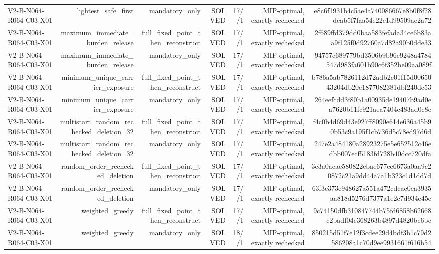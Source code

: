 {\begin{longtable}{lrrrrrr}
V2-B-N064-R064-C03-X01 & lightest\_safe\_first & mandatory\_only & SOLVED & 17//1 & MIP-optimal, exactly rechecked & e8c6f1931b4c5ae4a740086667e8b0f8f28dcab5f7faa54e22e1d99509ae2a72 \\
V2-B-N064-R064-C03-X01 & maximum\_immediate\_burden\_release & full\_fixed\_point\_then\_reconstruct & SOLVED & 17//1 & MIP-optimal, exactly rechecked & 2f689ffd379dd0baa583fefada34ce6b83aa9f125f0d92760a7d82a90b0dde33 \\
V2-B-N064-R064-C03-X01 & maximum\_immediate\_burden\_release & mandatory\_only & SOLVED & 17//1 & MIP-optimal, exactly rechecked & 94757c689779bd3506b9b96e9248a4784547d983fa601b90c6f352be09aa089f \\
V2-B-N064-R064-C03-X01 & minimum\_unique\_carrier\_exposure & full\_fixed\_point\_then\_reconstruct & SOLVED & 17//1 & MIP-optimal, exactly rechecked & b786a5ab7826112d72adb2e01f15d0065043204db20e1877082381dbf240dc53 \\
V2-B-N064-R064-C03-X01 & minimum\_unique\_carrier\_exposure & mandatory\_only & SOLVED & 17//1 & MIP-optimal, exactly rechecked & 264eefcdd3f80b1a00935de19407b9ad0ea7620b11fc921aea7404c483ad0e8e \\
V2-B-N064-R064-C03-X01 & multistart\_random\_rechecked\_deletion\_32 & full\_fixed\_point\_then\_reconstruct & SOLVED & 17//1 & MIP-optimal, exactly rechecked & f4c0b4d69d43e927ff8090e614e636a45b90b53c9a195f1cb736d5c78ed97d6d \\
V2-B-N064-R064-C03-X01 & multistart\_random\_rechecked\_deletion\_32 & mandatory\_only & SOLVED & 17//1 & MIP-optimal, exactly rechecked & 247e2a484180a28923275e5e652512c46edbb007ecf5183fd728b40dcc720dfa \\
V2-B-N064-R064-C03-X01 & random\_order\_rechecked\_deletion & full\_fixed\_point\_then\_reconstruct & SOLVED & 17//1 & MIP-optimal, exactly rechecked & 3e3a0acae580822ebae677ce6673a0aa9c20872c21a9dd44a7a1b323c1d1dd7d \\
V2-B-N064-R064-C03-X01 & random\_order\_rechecked\_deletion & mandatory\_only & SOLVED & 17//1 & MIP-optimal, exactly rechecked & 63f3e373e948627a551a472cdcac0ea3935aa818d5276d7377a1e2c7d934e45e \\
V2-B-N064-R064-C03-X01 & weighted\_greedy & full\_fixed\_point\_then\_reconstruct & SOLVED & 17//1 & MIP-optimal, exactly rechecked & 9c74150dfb310847744b75fd6858b62668c2badf04c368263b4897d4820be6bc \\
V2-B-N064-R064-C03-X01 & weighted\_greedy & mandatory\_only & SOLVED & 18//1 & MIP-optimal, exactly rechecked & 850215d51f7e12f3cdee29d4bdf3b1c79d2586208a1c70d9ee9931661f616b54 \\

\end{longtable}}
